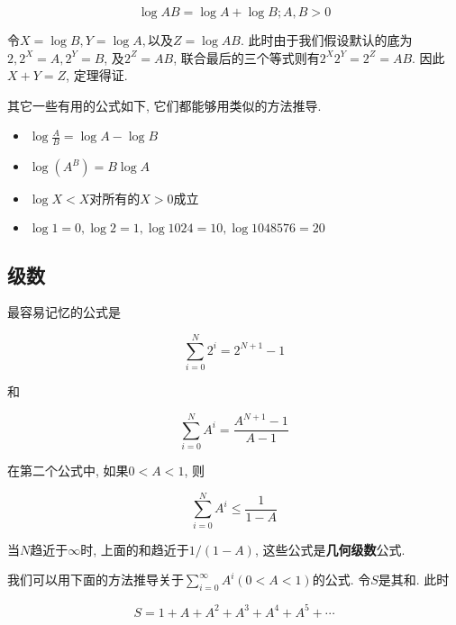 \documentclass[oneside]{ctexbook}
\begin{document}
\begin{mytheorem}{}{}
\begin{equation*}
    \log{AB} = \log{A} + \log{B}; A,B > 0
\end{equation*}
\end{mytheorem}

\begin{myproof}{}{}
    令$X=\log{B}, Y=\log{A}, \text{以及}Z=\log{AB}$. 此时由于我们假设默认的底为$2, 2^X=A, 2^Y = B$, 及$2^Z=AB$, 联合最后的三个等式则有$2^X2^Y=2^Z=AB$. 因此$X+Y=Z$, 定理得证.
\end{myproof}

其它一些有用的公式如下, 它们都能够用类似的方法推导.

\begin{itemize}
    \item $\log{\frac{A}{B}} = \log{A} - \log{B}$
    \item $\log{(A^B)} = B\log{A}$
    \item $\log{X} < X \text{对所有的} X > 0 \text{成立}$
    \item $\log{1} = 0, \log{2}=1, \log{1024}=10, \log{1048576}=20$
\end{itemize}

\subsection{级数}\label{级数}

最容易记忆的公式是

\begin{equation*}
    \sum_{i=0}^{N}2^i = 2^{N+1} - 1
\end{equation*}

和

\begin{equation*}
    \sum_{i=0}^{N}A^i = \frac{A^{N+1}-1}{A-1}
\end{equation*}

在第二个公式中, 如果$0<A<1$, 则

\begin{equation*}
    \sum_{i=0}^{N}A^i \le \frac{1}{1-A}
\end{equation*}

当$N$趋近于$\infty$时, 上面的和趋近于$1/(1-A)$, 这些公式是\textbf{几何级数}公式.

我们可以用下面的方法推导关于$\sum_{i=0}^{\infty}A^i(0<A<1)$的公式. 令$S$是其和. 此时

\begin{equation*}
    S=1+A+A^2+A^3+A^4+A^5+\cdots
\end{equation*}
\end{document}
